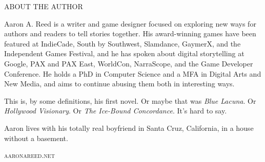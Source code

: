 \cleartorecto

\thispagestyle{empty}
\begin{parascale}[0.88]

\vspace*{9\nbs}

\begin{adjustwidth}{4em}{4em}
\begin{center}
\textsc{ABOUT THE AUTHOR}
\end{center}
\vspace*{2\nbs}

Aaron A. Reed is a writer and game designer focused on exploring new ways for authors and readers to tell stories together. His award-winning games have been featured at IndieCade, South by Southwest, Slamdance, GaymerX, and the Independent Games Festival, and he has spoken about digital storytelling at Google, PAX and PAX East, WorldCon, NarraScope, and the Game Developer Conference. He holds a PhD in Computer Science and a MFA in Digital Arts and New Media, and aims to continue abusing them both in interesting ways.

This is, by some definitions, his first novel. Or maybe that was \textit{Blue Lacuna}. Or \textit{Hollywood Visionary}. Or \textit{The Ice-Bound Concordance}. It's hard to say.

Aaron lives with his totally real boyfriend in Santa Cruz, California, in a house without a basement.
\end{adjustwidth}

\vspace*{2\nbs}

\begin{center}
\textsc{aaronareed.net}
\end{center}

\end{parascale}
